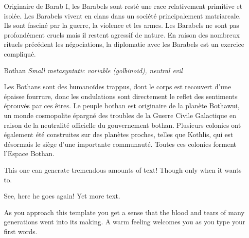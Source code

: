 Originaire de Barab I, les Barabels sont resté une race relativement primitive et isolée. Les Barabels vivent en clans dans un société principalement matriarcale. Ils sont fasciné par la guerre, la violence et les armes. Les Barabels ne sont pas profondément cruels mais il restent agressif de nature. En raison des nombreux rituels précédent les négociations, la diplomatie avec les Barabels est un exercice compliqué.

\begin{monsterbox}{Bothan}
	\textit{Small metasyntatic variable (golbinoid), neutral evil}\\
	\hline
	\basics[%
	type = Félin,
	planet = Bothawui,
	language = Bothese
	]
	\hline
	\traits[
    AGI = \stat{6} %
	]
	\stats[
    RES = 0 %
	]

	\hline
	
	\details[%
	size = 1m50
	]
	\hline 
	Les Bothans sont des humanoïdes trappus, dont le corps est recouvert d'une épaisse fourrure, donc les ondulations sont directement le reflet des sentiments éprouvés par ces êtres. 
  	Le peuple bothan est originaire de la planète Bothawui, un monde cosmopolite épargné des troubles de la Guerre Civile Galactique en raison de la neutralité officielle du gouvernement bothan. Plusieurs colonies ont également été construites sur des planètes proches, telles que Kothlis, qui est désormais le siège d'une importante communauté. Toutes ces colonies forment l'Espace Bothan. 
	\begin{monsteraction}
		This one can generate tremendous amounts of text! Though only when it wants to.
	\end{monsteraction}

	\begin{monsteraction}
    See, here he goes again! Yet more text.
	\end{monsteraction}
\end{monsterbox}

\begin{quotebox}
	As you approach this template you get a sense that the blood and tears of many generations went into its making. A warm feeling welcomes you as you type your first words.
\end{quotebox}

\newpage %

